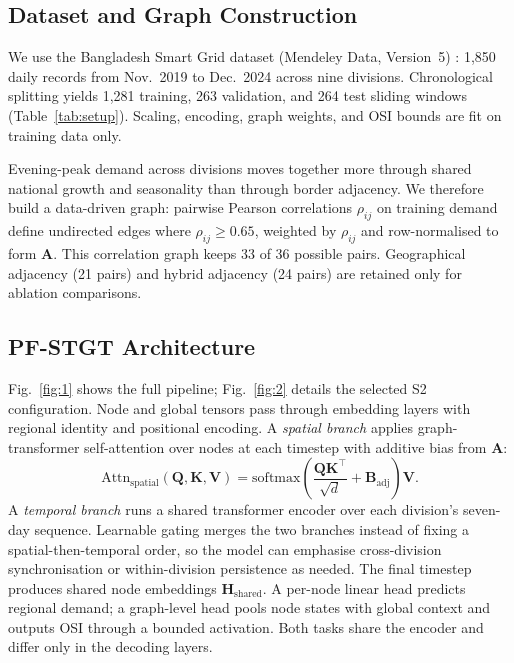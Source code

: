 \subsection{Dataset and Graph Construction}

We use the Bangladesh Smart Grid dataset (Mendeley Data, Version~5) \cite{Hossain2025BangladeshSmartGrid}: 1,850 daily records from Nov.\ 2019 to Dec.\ 2024 across nine divisions. Chronological splitting yields 1,281 training, 263 validation, and 264 test sliding windows (Table~\ref{tab:setup}). Scaling, encoding, graph weights, and OSI bounds are fit on training data only.

Evening-peak demand across divisions moves together more through shared national growth and seasonality than through border adjacency. We therefore build a data-driven graph: pairwise Pearson correlations $\rho_{ij}$ on training demand define undirected edges where $\rho_{ij} \geq 0.65$, weighted by $\rho_{ij}$ and row-normalised to form $\mathbf{A}$. This correlation graph keeps 33 of 36 possible pairs. Geographical adjacency (21 pairs) and hybrid adjacency (24 pairs) are retained only for ablation comparisons.



\subsection{PF-STGT Architecture}

Fig.~\ref{fig:1} shows the full pipeline; Fig.~\ref{fig:2} details the selected S2 configuration. Node and global tensors pass through embedding layers with regional identity and positional encoding. A \emph{spatial branch} applies graph-transformer self-attention over nodes at each timestep with additive bias from $\mathbf{A}$:
\begin{equation}
\mathrm{Attn}_{\mathrm{spatial}}(\mathbf{Q}, \mathbf{K}, \mathbf{V}) =
\mathrm{softmax}\!\left(\frac{\mathbf{Q}\mathbf{K}^\top}{\sqrt{d}} + \mathbf{B}_{\mathrm{adj}}\right)\mathbf{V}.
\label{eq:spatial}
\end{equation}
A \emph{temporal branch} runs a shared transformer encoder over each division's seven-day sequence. Learnable gating merges the two branches instead of fixing a spatial-then-temporal order, so the model can emphasise cross-division synchronisation or within-division persistence as needed. The final timestep produces shared node embeddings $\mathbf{H}_{\mathrm{shared}}$. A per-node linear head predicts regional demand; a graph-level head pools node states with global context and outputs OSI through a bounded activation. Both tasks share the encoder and differ only in the decoding layers.



